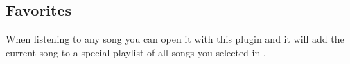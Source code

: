 \subsection{Favorites}
When listening to any song you can open it with this plugin and it will
add the current song to a special playlist of all songs you selected in
.
